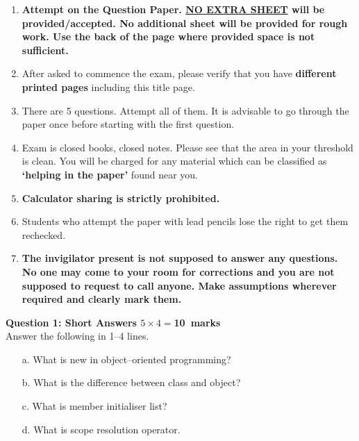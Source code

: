 \documentclass[12pt,a4paper]{article}
\def\QOne{10}
\begin{document}
\begin{enumerate}
\item \textbf{Attempt on the Question Paper. \underline{NO EXTRA SHEET} will be provided/accepted. No
additional sheet will be provided for rough work. Use the back of the page where
provided space is not sufficient.}
\item After asked to commence the exam, please verify that you have \textbf{\pageref{LastPage} different
printed pages} including this title page.
\item There are 5 questions. Attempt all of them. It is advisable to go through the paper once
before starting with the first question.
\item Exam is closed books, closed notes. Please see that the area in your threshold is clean.
You will be charged for any material which can be classified as \textbf{`helping in the paper'}
found near you.
\item \textbf{Calculator sharing is strictly prohibited.}
\item Students who attempt the paper with lead pencils lose the right to get them rechecked.
\item \textbf{The invigilator present is not supposed to answer any questions. No one may come
to your room for corrections and you are not supposed to request to call anyone.
Make assumptions wherever required and clearly mark them.}
\end{enumerate}
\newpage

\noindent\textbf{Question 1: Short Answers \hfill $5\times 4=$\QOne~marks}\\
Answer the following in 1--4 lines.
\begin{enumerate}
\item[a.] What is new in object--oriented programming?
\begin{figure}[H]
\end{figure}
\item[b.] What is the difference between class and object?
\begin{figure}[H]
\end{figure}
\item[c.] What is member initialiser list?
\begin{figure}[H]
\end{figure}
\item[d.] What is scope resolution operator.
\begin{figure}[H]
\end{figure}
\end{enumerate}
\newpage
\end{document}
